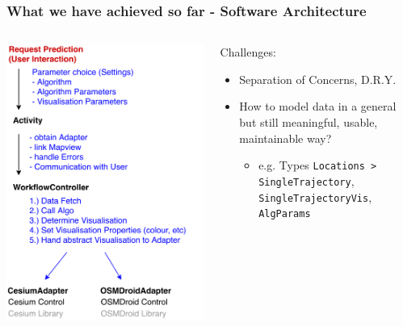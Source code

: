 \documentclass[xcolor=dvipsnames]{beamer}
\begin{document}
\begin{frame}
	\frametitle{What we have achieved so far - Software Architecture}
	\begin{columns}
	\begin{column}{0.5\textwidth}
		\includegraphics[width=\textwidth]{diagrams/controller-flow.pdf}
	\end{column}
	\begin{column}{0.5\textwidth}
		\fontsize{9pt}{7.2}\selectfont
		Challenges:
		\begin{itemize}
			\item Separation of Concerns, D.R.Y.
		 	 \item How to model data in a general but still meaningful, usable, maintainable way?
		 	 \begin{itemize}
		 	 	\item e.g. Types \lstinline$Locations > SingleTrajectory$, \lstinline$SingleTrajectoryVis$, \lstinline$AlgParams$
		 	 \end{itemize}
		\end{itemize}
 	\end{column}
	\end{columns}
\end{frame}
\end{document}
